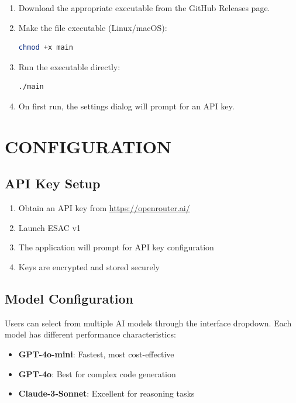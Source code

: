 \documentclass[tm]{ornltm} %
\begin{document}
\begin{enumerate}
  \item Download the appropriate executable from the GitHub Releases page.

  \item Make the file executable (Linux/macOS):
  \begin{lstlisting}[language=bash]
  chmod +x main
  \end{lstlisting}

  \item Run the executable directly:
  \begin{lstlisting}[language=bash]
  ./main
  \end{lstlisting}

  \item On first run, the settings dialog will prompt for an API key.
\end{enumerate}


\section{CONFIGURATION}
\label{app:configuration}

\subsection{API Key Setup}
\label{subsec:api_setup}

\begin{enumerate}
  \item Obtain an API key from \url{https://openrouter.ai/}
  \item Launch ESAC v1
  \item The application will prompt for API key configuration
  \item Keys are encrypted and stored securely
\end{enumerate}

\subsection{Model Configuration}
\label{subsec:model_config}

Users can select from multiple AI models through the interface dropdown. Each model has different performance characteristics:

\begin{itemize}
  \item \textbf{GPT-4o-mini}: Fastest, most cost-effective
  \item \textbf{GPT-4o}: Best for complex code generation
  \item \textbf{Claude-3-Sonnet}: Excellent for reasoning tasks
\end{itemize}

\backmatter

\end{document}
